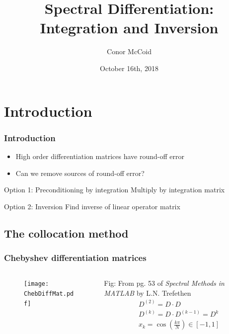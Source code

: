 \documentclass[handout]{beamer}
\title{Spectral Differentiation: Integration and Inversion}
\author{Conor McCoid}
\institute{University of Geneva}
\date{October 16th, 2018}
\begin{document}
\frame{\titlepage}

\section{Introduction}

\begin{frame}
\frametitle{Introduction}
\begin{itemize}
\item High order differentiation matrices have round-off error
\item Can we remove sources of round-off error?
\end{itemize}

\begin{block}{Option 1: Preconditioning by integration}
Multiply by integration matrix
\end{block}

\begin{block}{Option 2: Inversion}
Find inverse of linear operator matrix
\end{block}
\end{frame}

\subsection{The collocation method}

\begin{frame}
\frametitle{Chebyshev differentiation matrices}

\begin{columns}

\begin{column}{0.5\textwidth}
\begin{figure}
\texttt{[image: ChebDiffMat.pdf]}
\end{figure}
\end{column}
\begin{column}{0.5\textwidth}
Fig: From pg. 53 of \textit{Spectral Methods in MATLAB} by L.N. Trefethen
\begin{equation*} \label{diff matrix}
\begin{gathered}
D^{(2)} = D \cdot D \\ D^{(k)} = D \cdot D^{(k-1)} = D^k \\
x_k = \cos \left ( \frac{k \pi}{N} \right ) \in [-1,1]
\end{gathered}
\end{equation*}
\end{column}

\end{columns}
\end{frame}
\end{document}
